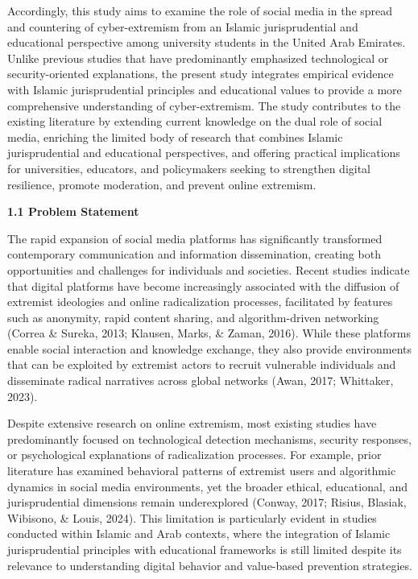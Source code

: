 \documentclass[11pt,a4paper]{article}
\begin{document}
	Accordingly, this study aims to examine the role of social media in the spread and countering of cyber-extremism from an Islamic jurisprudential and educational perspective among university students in the United Arab Emirates. Unlike previous studies that have predominantly emphasized technological or security-oriented explanations, the present study integrates empirical evidence with Islamic jurisprudential principles and educational values to provide a more comprehensive understanding of cyber-extremism. The study contributes to the existing literature by extending current knowledge on the dual role of social media, enriching the limited body of research that combines Islamic jurisprudential and educational perspectives, and offering practical implications for universities, educators, and policymakers seeking to strengthen digital resilience, promote moderation, and prevent online extremism.
	
	\textbf{1.1 Problem Statement  }
	
	The rapid expansion of social media platforms has significantly transformed contemporary communication and information dissemination, creating both opportunities and challenges for individuals and societies. Recent studies indicate that digital platforms have become increasingly associated with the diffusion of extremist ideologies and online radicalization processes, facilitated by features such as anonymity, rapid content sharing, and algorithm-driven networking (Correa \& Sureka, 2013; Klausen, Marks, \& Zaman, 2016). While these platforms enable social interaction and knowledge exchange, they also provide environments that can be exploited by extremist actors to recruit vulnerable individuals and disseminate radical narratives across global networks (Awan, 2017; Whittaker, 2023).
	
	Despite extensive research on online extremism, most existing studies have predominantly focused on technological detection mechanisms, security responses, or psychological explanations of radicalization processes. For example, prior literature has examined behavioral patterns of extremist users and algorithmic dynamics in social media environments, yet the broader ethical, educational, and jurisprudential dimensions remain underexplored (Conway, 2017; Risius, Blasiak, Wibisono, \& Louis, 2024). This limitation is particularly evident in studies conducted within Islamic and Arab contexts, where the integration of Islamic jurisprudential principles with educational frameworks is still limited despite its relevance to understanding digital behavior and value-based prevention strategies.
	
\end{document}
